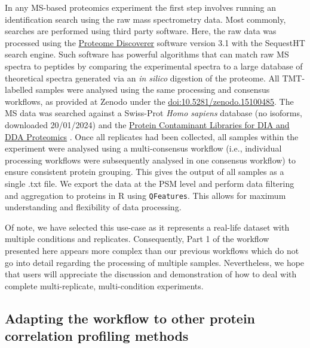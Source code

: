 \documentclass[9pt,a4paper,]{extarticle}
\begin{document}
In any MS-based proteomics experiment the first step involves running an
identification search using the raw mass spectrometry data. Most commonly, searches
are performed using third party software. Here, the raw data was processed using the
\href{https://www.thermofisher.com/uk/en/home/industrial/mass-spectrometry/liquid-chromatography-mass-spectrometry-lc-ms/lc-ms-software/multi-omics-data-analysis/proteome-discoverer-software.html}{Proteome Discoverer}
software version 3.1 with the SequestHT search engine. Such software has powerful
algorithms that can match raw MS spectra to peptides by comparing the experimental
spectra to a large database of theoretical spectra generated via an \emph{in silico}
digestion of the proteome. All TMT-labelled samples were analysed using the same
processing and consensus workflows, as provided at Zenodo under the \href{http://doi.org/10.5281/zenodo.15100485}{doi:10.5281/zenodo.15100485}. The MS data was
searched against a Swiss-Prot \emph{Homo sapiens} database (no isoforms, downloaded
20/01/2024) and the \href{https://github.com/HaoGroup-ProtContLib}{Protein Contaminant Libraries for DIA and DDA Proteomics}
\citep{Frankenfield2022}. Once all replicates had been collected, all samples within the
experiment were analysed using a multi-consensus workflow (i.e., individual processing
workflows were subsequently analysed in one consensus workflow) to ensure
consistent protein grouping. This gives the output of all samples as a single
.txt file. We export the data at the PSM level and perform data filtering and
aggregation to proteins in R using \texttt{QFeatures}. This allows for maximum
understanding and flexibility of data processing.

Of note, we have selected this use-case as it represents a real-life dataset
with multiple conditions and replicates. Consequently, Part 1 of the
workflow presented here appears more complex than our previous workflows \citep{Breckels2018, Crook2019}
which do not go into detail regarding the processing of multiple samples.
Nevertheless, we hope that users will appreciate the discussion
and demonstration of how to deal with complete multi-replicate, multi-condition
experiments.

\subsection{Adapting the workflow to other protein correlation profiling methods}\label{adapting-the-workflow-to-other-protein-correlation-profiling-methods}
\end{document}
